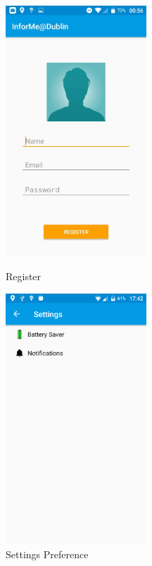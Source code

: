 \begin{figure}[!tbp]
	\centering
		\begin{minipage}[b]{0.4\textwidth}
			\includegraphics[width=150pt]{register}
			\caption{Register} 
			\label{Figure: Register}
		\end{minipage}
	\hfill
		\begin{minipage}[b]{0.4\textwidth}
			\includegraphics[width=150pt]{Settings-Preference}
			\caption{Settings Preference}
			\label{Figure: Settings Preference}
		\end{minipage}
\end{figure}
